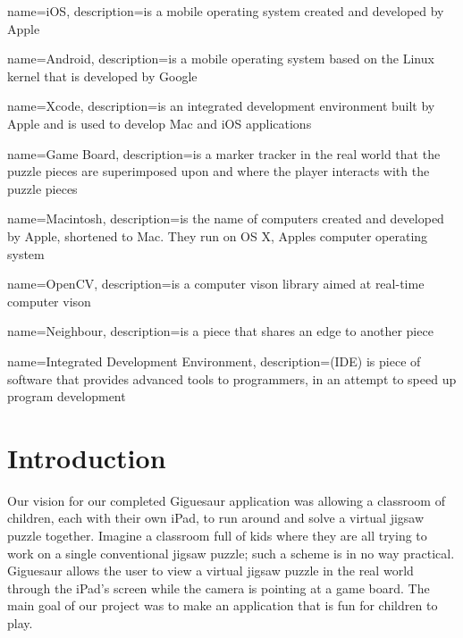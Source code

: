 \documentclass{article}
\begin{document}
 { name={iOS}, description={is a mobile operating system
    created and developed by Apple} }

 { name={Android}, description={is a mobile operating
    system based on the Linux kernel that is developed by Google} }

 { name={Xcode}, description={is an integrated
    development environment built by Apple and is used to develop Mac and iOS
    applications} }

 { name={Game Board}, description={is a marker
    tracker in the real world that the puzzle pieces are superimposed upon and
    where the player interacts with the puzzle pieces} }

 { name={Macintosh}, description={is the name of computers
    created and developed by Apple, shortened to Mac. They run on OS X, Apples
    computer operating system} }

 { name={OpenCV}, description={is a computer vison
    library aimed at real-time computer vison} }

 { name={Neighbour}, description={is a piece that
    shares an edge to another piece} }

 { name={Integrated Development Environment},
  description={(IDE) is piece of software that provides advanced tools to programmers,
    in an attempt to speed up program development} }


\makeglossaries


\clearpage
\tableofcontents
\clearpage

\setcounter{page}{1}


\section{Introduction}

Our vision for our completed Giguesaur application was allowing a classroom of
children, each with their own iPad, to run around and solve a virtual jigsaw
puzzle together. Imagine a classroom full of kids where they are all trying to
work on a single conventional jigsaw puzzle; such a scheme is in no way
practical. Giguesaur allows the user to view a virtual jigsaw puzzle in the real
world through the iPad's screen while the camera is pointing at a game
board. The main goal of our project was to make an application that is fun for
children to play.
\end{document}
